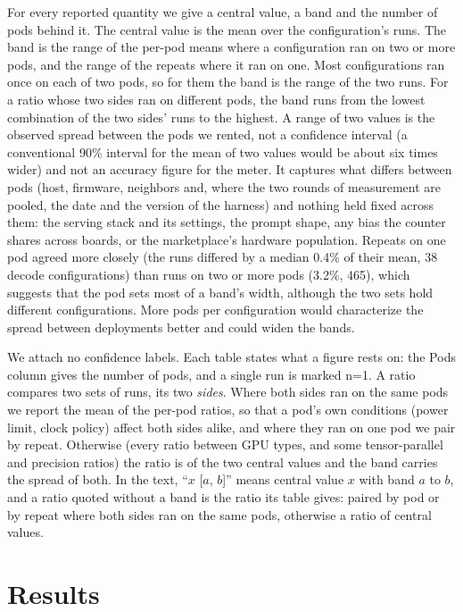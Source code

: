 \documentclass[11pt]{article}
\begin{document}
For every reported quantity we give a central value, a band and the number of pods behind it. The central value is the mean over the configuration's runs. The band is the range of the per-pod means where a configuration ran on two or more pods, and the range of the repeats where it ran on one. Most configurations ran once on each of two pods, so for them the band is the range of the two runs. For a ratio whose two sides ran on different pods, the band runs from the lowest combination of the two sides' runs to the highest. A range of two values is the observed spread between the pods we rented, not a confidence interval (a conventional 90\% interval for the mean of two values would be about six times wider) and not an accuracy figure for the meter. It captures what differs between pods (host, firmware, neighbors and, where the two rounds of measurement are pooled, the date and the version of the harness) and nothing held fixed across them: the serving stack and its settings, the prompt shape, any bias the counter shares across boards, or the marketplace's hardware population. Repeats on one pod agreed more closely (the runs differed by a median 0.4\% of their mean, 38 decode configurations) than runs on two or more pods (3.2\%, 465), which suggests that the pod sets most of a band's width, although the two sets hold different configurations. More pods per configuration would characterize the spread between deployments better and could widen the bands.

We attach no confidence labels. Each table states what a figure rests on: the Pods column gives the number of pods, and a single run is marked n=1. A ratio compares two sets of runs, its two \emph{sides}. Where both sides ran on the same pods we report the mean of the per-pod ratios, so that a pod's own conditions (power limit, clock policy) affect both sides alike, and where they ran on one pod we pair by repeat. Otherwise (every ratio between GPU types, and some tensor-parallel and precision ratios) the ratio is of the two central values and the band carries the spread of both. In the text, ``$x$ [$a$, $b$]'' means central value $x$ with band $a$ to $b$, and a ratio quoted without a band is the ratio its table gives: paired by pod or by repeat where both sides ran on the same pods, otherwise a ratio of central values.

\section{Results}\label{sec:results}
\end{document}
